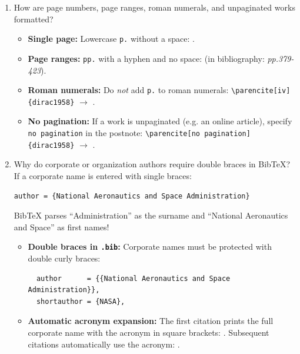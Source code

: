 \documentclass[a4paper,11pt]{article}
\begin{document}
\begin{enumerate}
\item How are page numbers, page ranges, roman numerals, and unpaginated works formatted?\\
\begin{itemize}
  \item \textbf{Single page:} Lowercase \texttt{p.} without a space: \parencite[24]{shannon1948}.
  \item \textbf{Page ranges:} \texttt{pp.} with a hyphen and no space: \parencite{shannon1948} (in bibliography: \emph{pp.379-423}).
  \item \textbf{Roman numerals:} Do \emph{not} add \texttt{p.} to roman numerals: \texttt{\textbackslash parencite[iv]\{dirac1958\}} $\to$ \parencite[iv]{dirac1958}.
  \item \textbf{No pagination:} If a work is unpaginated (e.g. an online article), specify \texttt{no pagination} in the postnote: \texttt{\textbackslash parencite[no pagination]\{dirac1958\}} $\to$ \parencite[no pagination]{dirac1958}.
\end{itemize}

\item Why do corporate or organization authors require double braces in BibTeX?\\
If a corporate name is entered with single braces:
\begin{verbatim}
author = {National Aeronautics and Space Administration}
\end{verbatim}
BibTeX parses ``Administration'' as the surname and ``National Aeronautics and Space'' as first names!
\begin{itemize}
  \item \textbf{Double braces in \texttt{.bib}:} Corporate names must be protected with double curly braces:
  \begin{verbatim}
  author      = {{National Aeronautics and Space Administration}},
  shortauthor = {NASA},
  \end{verbatim}
  \item \textbf{Automatic acronym expansion:} The first citation prints the full corporate name with the acronym in square brackets: \parencite{nasa2011}. Subsequent citations automatically use the acronym: \parencite{nasa2011}.
\end{itemize}


\end{enumerate}
\end{document}
